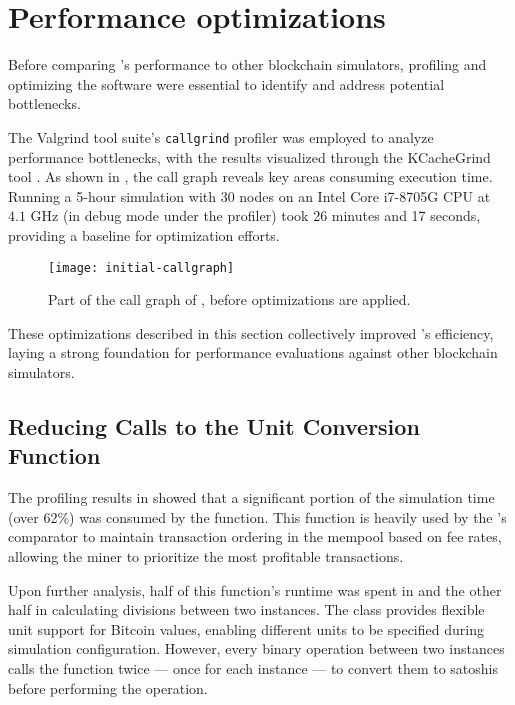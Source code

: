 \section{Performance optimizations}\label{sec:optimizations}

Before comparing \iblock{}'s performance to other blockchain simulators,
profiling and optimizing the software were essential to identify and address
potential bottlenecks.

The Valgrind tool suite's \texttt{callgrind} profiler was employed to analyze
performance bottlenecks, with the results visualized through the KCacheGrind
tool \cites{callgrind, valgrind}. As shown in , the call
graph reveals key areas consuming execution time. Running a 5-hour simulation
with 30 nodes on an Intel Core i7-8705G CPU at \(4.1\) GHz (in debug mode under
the profiler) took 26 minutes and 17 seconds, providing a baseline for
optimization efforts.

\begin{figure}[tbhp]
	\centering
	\texttt{[image: initial-callgraph]}
	\caption{Part of the call graph of \iblock{}, before optimizations are
	applied.}\label{fig:callgrind}
\end{figure}

These optimizations described in this section collectively improved \iblock{}'s
efficiency, laying a strong foundation for performance evaluations against
other blockchain simulators.

\subsection{Reducing Calls to the Unit Conversion
Function}\label{subsec:reducing-convert-calls}

The profiling results in  showed that a significant
portion of the simulation time (over 62\%) was consumed by the
 function. This function is heavily used by the
's comparator to maintain transaction ordering in the
mempool based on fee rates, allowing the miner to prioritize the most
profitable transactions.

Upon further analysis, half of this function's runtime was spent in
 and the other half in calculating divisions between two
 instances. The  class provides flexible unit
support for Bitcoin values, enabling different units to be specified during
simulation configuration. However, every binary operation between two
 instances calls the  function twice --- once
for each instance --- to convert them to satoshis before performing the
operation.

